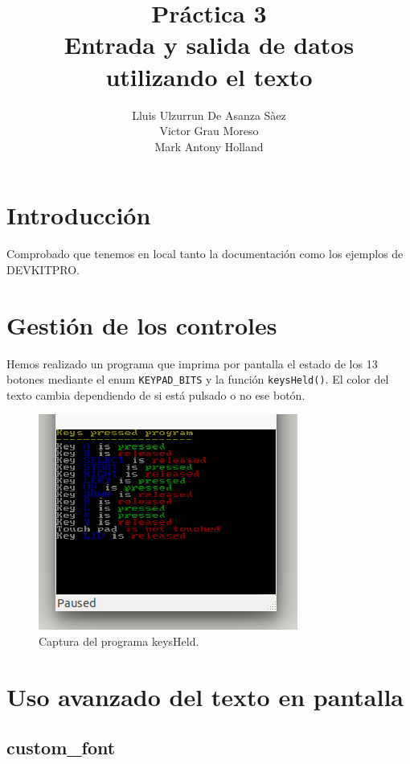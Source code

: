\documentclass[12pt,english]{article}
\title{Práctica 3\\ Entrada y salida de datos utilizando el texto}
\author{Lluis Ulzurrun De Asanza Sàez\\Victor Grau Moreso \\Mark Antony Holland}
\date{}
\begin{document}
    \maketitle

    \tableofcontents

    \newpage
    
    \section{Introducción}

    Comprobado que tenemos en local tanto la documentación como los ejemplos de DEVKITPRO.

    \section{Gestión de los controles}

    Hemos realizado un programa que imprima por pantalla el estado de los 13 botones mediante el enum \texttt{KEYPAD\_BITS} y la función \texttt{keysHeld()}. El color del texto cambia dependiendo de si está pulsado o no ese botón.
    
    \begin{figure}[H] 
    \centering
    \includegraphics[scale=0.5]{images/keysHeld}
    \caption{Captura del programa keysHeld.}
    \end{figure}

    \newpage

    \section{Uso avanzado del texto en pantalla}

    \subsection{custom\_font}
\end{document}
